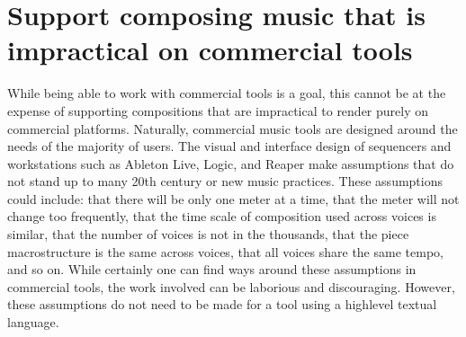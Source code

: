 \documentclass[letterpaper,10pt,english]{sphinxmanual}
\begin{document}
\section{Support composing music that is impractical on commercial tools}
\label{\detokenize{goals:support-composing-music-that-is-impractical-on-commercial-tools}}
\sphinxAtStartPar
While being able to work with commercial tools is a goal, this cannot be at the expense of supporting
compositions that are impractical to render purely on commercial platforms.
Naturally, commercial music tools are designed around the needs of the majority of users.
The visual and interface design of sequencers and workstations such as Ableton Live, Logic, and Reaper
make assumptions that do not stand up to many 20th century or new music practices.
These assumptions could include: that there will be only one meter at a time, that the meter will not change too frequently,
that the time scale of composition used across voices is similar, that the number of voices is not
in the thousands, that the piece macro\sphinxhyphen{}structure is the same across voices, that all voices share the same tempo,
and so on. While certainly one can find ways around these assumptions in commercial tools, the work
involved can be laborious and discouraging.
However, these assumptions do not need to be made for a tool using a high\sphinxhyphen{}level textual language.
\end{document}
